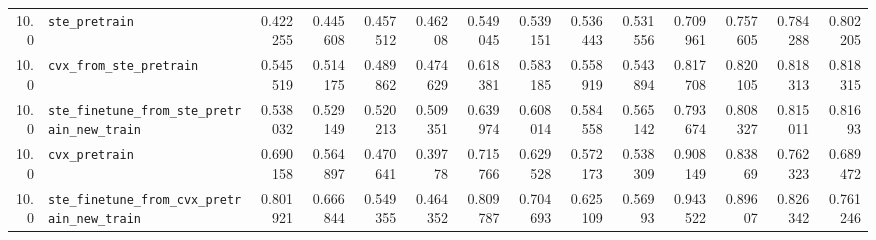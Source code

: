 \begin{longtable}{@{}r l *{12}{r}@{}}
10.0 & \texttt{ste\_pretrain} & 0.422255 & 0.445608 & 0.457512 & 0.46208 & 0.549045 & 0.539151 & 0.536443 & 0.531556 & 0.709961 & 0.757605 & 0.784288 & 0.802205 \\
10.0 & \texttt{cvx\_from\_ste\_pretrain} & 0.545519 & 0.514175 & 0.489862 & 0.474629 & 0.618381 & 0.583185 & 0.558919 & 0.543894 & 0.817708 & 0.820105 & 0.818313 & 0.818315 \\
10.0 & \texttt{ste\_finetune\_from\_ste\_pretrain\_new\_train} & 0.538032 & 0.529149 & 0.520213 & 0.509351 & 0.639974 & 0.608014 & 0.584558 & 0.565142 & 0.793674 & 0.808327 & 0.815011 & 0.81693 \\
10.0 & \texttt{cvx\_pretrain} & 0.690158 & 0.564897 & 0.470641 & 0.39778 & 0.715766 & 0.629528 & 0.572173 & 0.538309 & 0.908149 & 0.83869 & 0.762323 & 0.689472 \\
10.0 & \texttt{ste\_finetune\_from\_cvx\_pretrain\_new\_train} & 0.801921 & 0.666844 & 0.549355 & 0.464352 & 0.809787 & 0.704693 & 0.625109 & 0.56993 & 0.943522 & 0.89607 & 0.826342 & 0.761246 \\
\end{longtable}
